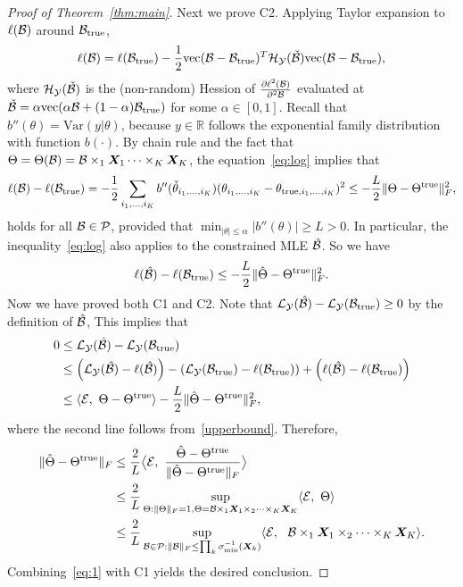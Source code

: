 \documentclass[11pt]{article}
\theoremstyle{plain}
\theoremstyle{definition}
\begin{document}
\begin{proof}[Proof of Theorem~\ref{thm:main}]
Next we prove C2. Applying Taylor expansion to $\ell(\tB)$ around $\trueB$, 
\begin{equation}\label{eq:log}
\ell(\tB)=\ell(\trueB)-{1\over 2}\text{vec}(\tB-\trueB)^T \tH_{\tY}(\check \tB)\text{vec}(\tB-\trueB),
\end{equation}
where $\tH_{\tY}(\check \tB)$ is the (non-random) Hession of ${\partial \ell^2 (\tB)\over\partial^2 \tB}$ evaluated at $\check \tB =\alpha \text{vec}(\alpha \tB+(1-\alpha)\trueB)$ for some $\alpha\in[0,1]$. Recall that $b''(\theta)=\text{Var}(y|\theta)$, because $y\in\mathbb{R}$ follows the exponential family distribution with function $b(\cdot)$. By chain rule and the fact that $\Theta=\Theta(\tB)=\tB\times_1\mX_1\cdots\times_K\mX_K$, the equation~\eqref{eq:log} implies that
\begin{equation}\label{eq:log}
\ell(\tB)-\ell(\trueB)=-{1\over 2}\sum_{i_1,\ldots,i_K}b''(\check \theta_{i_1,\ldots,i_K}) (\theta_{i_1,\ldots,i_K}-\theta_{\text{true},i_1,\ldots,i_K})^2 \leq -{L \over 2}\FnormSize{}{\Theta-\trueT}^2,
\end{equation}
holds for all $\tB\in\tP$, provided that $\min_{|\theta|\leq \alpha}|b''(\theta)|\geq L>0$. In particular, the inequality~\eqref{eq:log} also applies to the constrained MLE $\hat \tB$. So we have
\begin{equation}\label{upperbound}
\ell(\hat \tB)-\ell(\trueB)\leq -{L \over 2}\FnormSize{}{\hat \Theta-\trueT}^2.
\end{equation}
Now we have proved both C1 and C2. Note that $\tL_{\tY}(\hat \tB)- \tL_{\tY}(\trueB)\geq 0$ by the definition of $\hat \tB$, This implies that
\begin{align}
0&\leq \tL_{\tY}(\hat \tB)- \tL_{\tY}(\trueB) \\
&\leq \left(\tL_{\tY}(\hat \tB)-\ell(\hat \tB)\right)-\left( \tL_{\tY}(\trueB)-\ell(\trueB)\right)+\left(\ell(\hat \tB)-\ell(\trueB)\right)\\
&\leq \langle\tE,\ \Theta-\trueT    \rangle -{L\over 2}\FnormSize{}{\hat \Theta-\trueT}^2,
\end{align}
where the second line follows from~\eqref{upperbound}. Therefore,
\begin{align}\label{eq:1}
\FnormSize{}{\hat \Theta-\trueT}&\leq {2\over L}\big\langle \tE,\ {\hat \Theta -\trueT \over \FnormSize{}{\hat \Theta-\trueT}} \big\rangle\notag \\
&\leq {2\over L}\sup_{\Theta: \FnormSize{}{\Theta}=1, \Theta=\tB\times_1\mX_1\times_2\cdots\times_K \mX_K}\langle \tE,\ \Theta \rangle\notag \\
&\leq {2\over L}\sup_{\tB\in\tP: \FnormSize{}{\tB}\leq \prod_k \sigma^{-1}_{\min}(\mX_k)} \langle \tE,\ \ \tB\times_1\mX_1\times_2\cdots\times_K\mX_K\rangle.
\end{align}
Combining~\eqref{eq:1} with C1 yields the desired conclusion. 


\end{proof}
\end{document}
